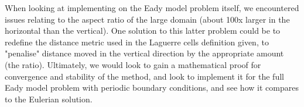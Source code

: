 \documentclass[11pt, oneside]{article}   	%
\begin{document}
When looking at implementing on the Eady model problem itself, we encountered issues relating to the aspect ratio of the large domain (about 100x larger in the horizontal than the vertical). One solution to this latter problem could be to redefine the distance metric used in the Laguerre cells definition given, to "penalise" distance moved in the vertical direction by the appropriate amount (the ratio). Ultimately, we would look to gain a mathematical proof for convergence and stability of the method, and look to implement it for the full Eady model problem with periodic boundary conditions, and see how it compares to the Eulerian solution.



\end{document}
